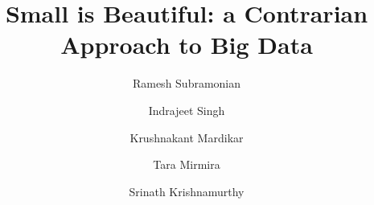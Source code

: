 \documentclass[10pt,sigconf]{acmart}
\begin{document}
\title{Small is Beautiful: a Contrarian Approach to Big Data}


\author{Ramesh Subramonian}

\author{Indrajeet Singh}

\author{Krushnakant Mardikar}

\author{Tara Mirmira}

\author{Srinath Krishnamurthy}

  \renewcommand{\shortauthors}{R. Subramonian et al}




%
%


\maketitle



% 
\newpage

 
\end{document}

